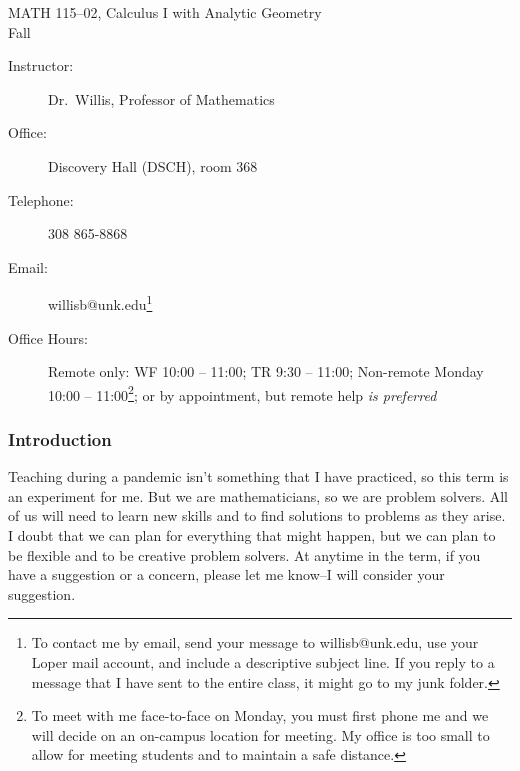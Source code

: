 \documentclass[12pt]{article}
\newcounter{ex}\setcounter{ex}{0}
\newcommand{\term}{Fall}
\newcommand{\course}{MATH 115--02,  Calculus I with Analytic Geometry}
\begin{document}
\large
\begin{center}
    {\course \\ \term{} \the\year} \\
\end{center}
\vskip0.25in
\normalsize

\begin{center}
\begin{description}
    \item[Instructor:] Dr.\  Willis, Professor of Mathematics
    \item[Office:] Discovery Hall (DSCH), room 368
    \item[Telephone:] 308 865-8868
   \item[Email:] willisb@unk.edu\footnote{To contact me by email, send your message to willisb@unk.edu, use your Loper mail account, and include a descriptive subject line. If you reply to a message that
I have sent to the entire class, it might go to my junk folder.}
     \item[Office Hours:] Remote only:  WF 10:00 -- 11:00; TR 9:30 -- 11:00; Non-remote Monday 10:00 -- 11:00\footnote{To meet with me face-to-face on Monday, you must first phone me and we will decide on an on-campus location for meeting.  My office is too small to allow for meeting students and to maintain a safe distance.}; or by appointment, but remote help \emph{is preferred}
\end{description}
\end{center}


\subsubsection*{Introduction}


Teaching during a pandemic isn't something that I have practiced, so this term is an experiment for me.  But we are mathematicians, so we are problem solvers. All of us will need to learn new skills and to find solutions to problems as they arise.  I doubt that we can plan for everything that might happen, but we can plan to be flexible and to be creative problem solvers.  At anytime in the term, if you have a suggestion or a concern, please let me know--I will consider your suggestion.
\end{document}

